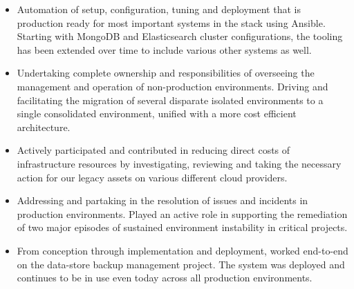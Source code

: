 \documentclass[10pt,a4paper,ragged2e,withhyper]{altacv}
\begin{document}
  
  \makecvheader
  
    \begin{paracol}{2}
  
    
            \begin{itemize}
                \item Automation of setup, configuration, tuning and deployment that is production ready for most important systems in the stack using Ansible. Starting with MongoDB and Elasticsearch cluster configurations, the tooling has been extended over time to include various other systems as well.
                \item Undertaking complete ownership and responsibilities of overseeing the management and operation of non-production environments. Driving and facilitating the migration of several disparate isolated environments to a single consolidated environment, unified with a more cost efficient architecture.
                \item Actively participated and contributed in reducing direct costs of infrastructure resources by investigating, reviewing and taking the necessary action for our legacy assets on various different cloud providers.
                \item Addressing and partaking in the resolution of issues and incidents in production environments. Played an active role in supporting the remediation of two major episodes of sustained environment instability in critical projects.
                
            \end{itemize}

        \divider
        
            \begin{itemize}
                \item From conception through implementation and deployment, worked end-to-end on the data-store backup management project. The system was deployed and continues to be in use even today across all production environments.
                

\end{itemize}
\end{paracol}
\end{document}
